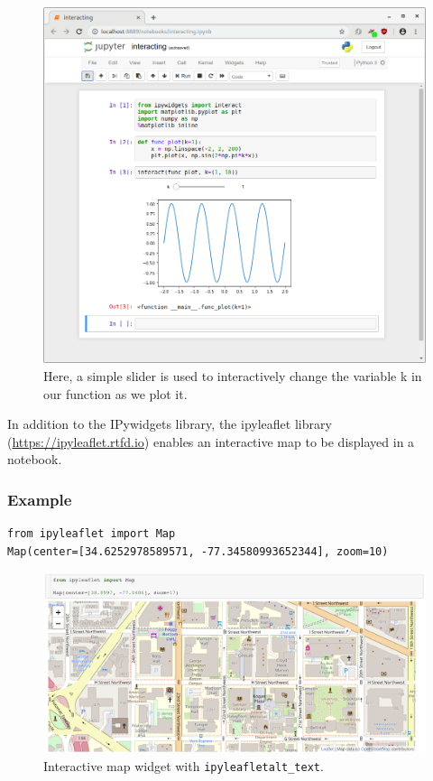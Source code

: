 \documentclass[]{book}
\begin{document}
\begin{figure}
\centering
\includegraphics{images/notebook-matplotlib-interact.png}
\caption{Here, a simple slider is used to interactively change the
variable k in our function as we plot it.}
\end{figure}

In addition to the IPywidgets library, the ipyleaflet library
(\url{https://ipyleaflet.rtfd.io}) enables an interactive map to be
displayed in a notebook.

\subsubsection{Example}\label{example}

\begin{verbatim}
from ipyleaflet import Map
Map(center=[34.6252978589571, -77.34580993652344], zoom=10)
\end{verbatim}

\begin{figure}
\centering
\includegraphics{images/chapter52.png}
\caption{Interactive map widget with \texttt{ipyleafletalt\_text}.}
\end{figure}
\end{document}
